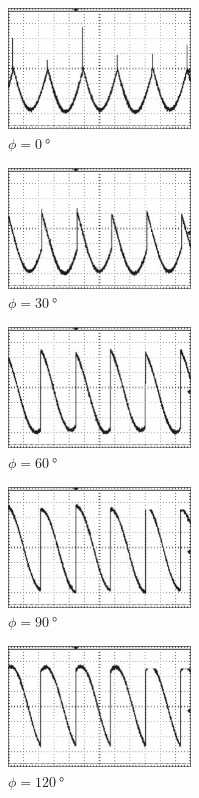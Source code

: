 	\begin{subfigure}{0.3\textwidth}
		\centering
		\includegraphics[height=3.21cm]{content/no_noise/0_no_noise.png}
		\caption{$\phi = \qty{0}{\degree}$}
	\end{subfigure}
	\hfill
	\begin{subfigure}{0.3\textwidth}
		\centering
		\includegraphics[height=3.21cm]{content/no_noise/30_no_noise.png}
		\caption{$\phi = \qty{30}{\degree}$}
	\end{subfigure}
	\hfill
	\begin{subfigure}{0.3\textwidth}
		\centering
		\includegraphics[height=3.21cm]{content/no_noise/60_no_noise.png}
		\caption{$\phi = \qty{60}{\degree}$}
	\end{subfigure}
	\par\bigskip
	\begin{subfigure}{0.3\textwidth}
		\centering
		\includegraphics[height=3.21cm]{content/no_noise/90_no_noise.png}
		\caption{$\phi = \qty{90}{\degree}$}
	\end{subfigure}
	\hfill
	\begin{subfigure}{0.3\textwidth}
		\centering
		\includegraphics[height=3.21cm]{content/no_noise/120_no_noise.png}
		\caption{$\phi = \qty{120}{\degree}$}
	\end{subfigure}
